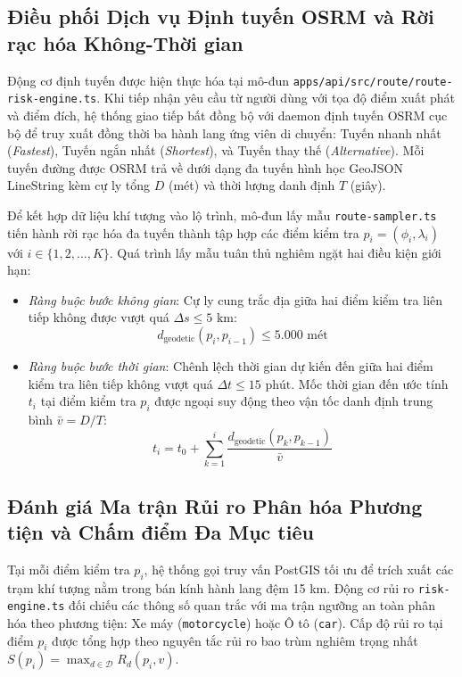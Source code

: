 \subsection{Điều phối Dịch vụ Định tuyến OSRM và Rời rạc hóa Không-Thời gian}
Động cơ định tuyến được hiện thực hóa tại mô-đun \texttt{apps/api/src/route/}\allowbreak\texttt{route-}\allowbreak\texttt{risk-}\allowbreak\texttt{engine.ts}. Khi tiếp nhận yêu cầu từ người dùng với tọa độ điểm xuất phát và điểm đích, hệ thống giao tiếp bất đồng bộ với daemon định tuyến OSRM cục bộ để truy xuất đồng thời ba hành lang ứng viên di chuyển: Tuyến nhanh nhất (\textit{Fastest}), Tuyến ngắn nhất (\textit{Shortest}), và Tuyến thay thế (\textit{Alternative}). Mỗi tuyến đường được OSRM trả về dưới dạng đa tuyến hình học GeoJSON LineString kèm cự ly tổng $D$ (mét) và thời lượng danh định $T$ (giây).

Để kết hợp dữ liệu khí tượng vào lộ trình, mô-đun lấy mẫu \texttt{route-sampler.ts} tiến hành rời rạc hóa đa tuyến thành tập hợp các điểm kiểm tra $p_i = (\phi_i, \lambda_i)$ với $i \in \{1, 2, \dots, K\}$. Quá trình lấy mẫu tuân thủ nghiêm ngặt hai điều kiện giới hạn:
\begin{itemize}
    \item[-] \textit{Ràng buộc bước không gian}: Cự ly cung trắc địa giữa hai điểm kiểm tra liên tiếp không được vượt quá $\Delta s \le 5\text{ km}$:
    \begin{equation}
    \label{eq:spatial_step_bound_vi}
    d_{\text{geodetic}}(p_i, p_{i-1}) \le 5.000\text{ mét}
    \end{equation}
    \item[-] \textit{Ràng buộc bước thời gian}: Chênh lệch thời gian dự kiến đến giữa hai điểm kiểm tra liên tiếp không vượt quá $\Delta t \le 15\text{ phút}$. Mốc thời gian đến ước tính $t_i$ tại điểm kiểm tra $p_i$ được ngoại suy động theo vận tốc danh định trung bình $\bar{v} = D / T$:
    \begin{equation}
    \label{eq:eta_extrapolation_vi}
    t_i = t_0 + \sum_{k=1}^i \frac{d_{\text{geodetic}}(p_k, p_{k-1})}{\bar{v}}
    \end{equation}
\end{itemize}

\subsection{Đánh giá Ma trận Rủi ro Phân hóa Phương tiện và Chấm điểm Đa Mục tiêu}
Tại mỗi điểm kiểm tra $p_i$, hệ thống gọi truy vấn PostGIS tối ưu để trích xuất các trạm khí tượng nằm trong bán kính hành lang đệm 15 km. Động cơ rủi ro \texttt{risk-engine.ts} đối chiếu các thông số quan trắc với ma trận ngưỡng an toàn phân hóa theo phương tiện: Xe máy (\texttt{motorcycle}) hoặc Ô tô (\texttt{car}). Cấp độ rủi ro tại điểm $p_i$ được tổng hợp theo nguyên tắc rủi ro bao trùm nghiêm trọng nhất $S(p_i) = \max_{d \in \mathcal{D}} R_d(p_i, v)$.

